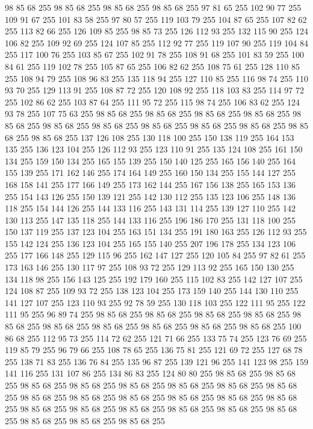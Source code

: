 98 85 68 255 98 85 68 255 98 85 68 255 98 85 68 255 97 81 65 255 102 90 77 255 109 91 67 255 101 83 58 255 97 80 57 255 119 103 79 255 104 87 65 255 107 82 62 255 113 82 66 255 126 109 85 255 98 85 73 255 126 112 93 255 132 115 90 255 124 106 82 255 109 92 69 255 124 107 85 255 112 92 77 255 119 107 90 255 119 104 84 255 117 100 76 255 103 85 67 255 102 91 78 255 108 91 68 255 101 83 59 255 100 84 61 255 119 102 78 255 105 87 65 255 106 82 62 255 108 75 61 255 128 110 85 255 108 94 79 255 108 96 83 255 135 118 94 255 127 110 85 255 116 98 74 255 110 93 70 255 129 113 91 255 108 87 72 255 120 108 92 255 118 103 83 255 114 97 72 255 102 86 62 255 103 87 64 255 111 95 72 255 115 98 74 255 106 83 62 255 124 93 78 255 107 75 63 255 98 85 68 255 98 85 68 255 98 85 68 255 98 85 68 255 98 85 68 255 98 85 68 255 98 85 68 255 98 85 68 255 98 85 68 255 98 85 68 255 98 85 68 255 98 85 68 255
137 126 108 255 130 118 100 255 150 138 119 255 164 153 135 255 136 123 104 255 126 112 93 255 123 110 91 255 135 124 108 255 161 150 134 255 159 150 134 255 165 155 139 255 150 140 125 255 165 156 140 255 164 155 139 255 171 162 146 255 174 164 149 255 160 150 134 255 155 144 127 255 168 158 141 255 177 166 149 255 173 162 144 255 167 156 138 255 165 153 136 255 154 143 126 255 150 139 121 255 142 130 112 255 135 123 106 255 148 136 118 255 154 144 126 255 144 133 116 255 143 131 114 255 139 127 110 255 142 130 113 255 147 135 118 255 144 133 116 255 196 186 170 255 131 118 100 255 150 137 119 255 137 123 104 255 163 151 134 255 191 180 163 255 126 112 93 255 155 142 124 255 136 123 104 255 165 155 140 255 207 196 178 255 134 123 106 255 177 166 148 255 129 115 96 255 162 147 127 255 120 105 84 255 97 82 61 255 173 163 146 255 130 117 97 255 108 93 72 255 129 113 92 255 165 150 130 255 134 118 98 255 156 143 125 255 192 179 160 255 115 102 83 255 142 127 107 255 124 108 87 255 109 93 72 255
138 123 104 255 173 159 140 255 144 130 110 255 141 127 107 255 123 110 93 255 92 78 59 255 130 118 103 255 122 111 95 255 122 111 95 255 96 89 74 255 98 85 68 255 98 85 68 255 98 85 68 255 98 85 68 255 98 85 68 255 98 85 68 255 98 85 68 255 98 85 68 255 98 85 68 255 98 85 68 255 100 86 68 255 112 95 73 255 114 72 62 255 121 71 66 255 133 75 74 255 123 76 69 255 119 85 79 255 96 79 66 255 108 78 65 255 136 75 81 255 121 69 72 255 127 68 78 255 138 71 83 255 136 76 84 255 135 96 87 255 139 121 96 255 141 123 98 255 159 141 116 255 131 107 86 255 134 86 83 255 124 80 80 255 98 85 68 255 98 85 68 255 98 85 68 255 98 85 68 255 98 85 68 255 98 85 68 255 98 85 68 255 98 85 68 255 98 85 68 255 98 85 68 255 98 85 68 255 98 85 68 255 98 85 68 255 98 85 68 255 98 85 68 255 98 85 68 255 98 85 68 255 98 85 68 255 98 85 68 255 98 85 68 255 98 85 68 255 98 85 68 255 98 85 68 255
